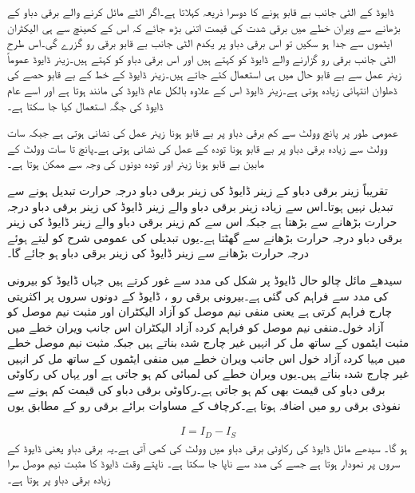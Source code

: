 ڈایوڈ کے الٹی جانب بے قابو ہونے کا دوسرا ذریعہ   کہلاتا ہے۔اگر الٹے مائل کرنے والے برقی دباو کے بڑھانے سے ویران خطے میں برقی شدت کی قیمت اتنی بڑھ جائے کہ اس کے کھینچ سے ہی الیکٹران ایٹموں سے جدا ہو سکیں تو اس برقی دباو پر یکدم الٹی جانب بے قابو برقی رو گزرے گی۔اس طرح الٹی جانب برقی رو گزارنے والے ڈایوڈ کو   کہتے ہیں اور اس برقی دباو   کو   کہتے ہیں۔زینر  ڈایوڈ عموماً زینر عمل سے بے قابو حال میں ہی استعمال کئے جاتے ہیں۔زینر  ڈایوڈ کے خط کے بے قابو حصے کی ڈھلوان  انتہائی زیادہ ہوتی ہے۔زینر  ڈایوڈ اس کے علاوہ بالکل عام  ڈایوڈ کی مانند ہوتا ہے اور اسے عام  ڈایوڈ کی جگہ استعمال کیا جا سکتا ہے۔

عمومی طور پر پانچ وولٹ سے کم برقی دباو پر بے قابو ہونا زینر عمل کی نشانی ہوتی ہے جبکہ سات وولٹ سے زیادہ برقی دباو پر بے قابو ہونا تودہ کے عمل کی نشانی ہوتی ہے۔پانچ تا سات وولٹ کے مابین بے قابو ہونا زینر اور تودہ دونوں کی وجہ سے ممکن ہوتا ہے۔

تقریباً  زینر برقی دباو کے زینر ڈایوڈ کی زینر  برقی دباو درجہ حرارت تبدیل ہونے سے تبدیل نہیں ہوتا۔اس سے زیادہ زینر برقی دباو والے زینر ڈایوڈ کی زینر برقی دباو درجہ حرارت بڑھانے سے بڑھتا ہے جبکہ اس سے کم  زینر برقی دباو والے زینر ڈایوڈ کی زینر برقی دباو درجہ حرارت بڑھانے سے گھٹتا ہے۔یوں  تبدیلی کی عمومی شرح کو  لیتے ہوئے درجہ حرارت  بڑھانے سے  زینر ڈایوڈ کی زینر برقی دباو  ہو جائے گا۔  

	سیدھے مائل چالو حال ڈایوڈ پر شکل   کی مدد سے غور کرتے ہیں جہاں ڈایوڈ کو بیرونی   کی مدد سے  فراہم کی گئی ہے۔بیرونی برقی رو ، ڈایوڈ کے دونوں سروں پر اکثریتی چارج فراہم کرتی ہے یعنی منفی نیم موصل کو آزاد الیکٹران اور مثبت نیم موصل کو آزاد خول۔منفی نیم موصل کو فراہم کردہ آزاد الیکٹران اس جانب ویران خطے میں مثبت ایٹموں کے ساتھ مل کر انہیں غیر چارج شدہ بناتے ہیں جبکہ مثبت نیم موصل خطے میں مہیا کردہ آزاد خول اس جانب ویران خطے میں منفی ایٹموں کے ساتھ مل کر انہیں غیر چارج شدہ بناتے ہیں۔یوں ویران خطے کی لمبائی کم ہو جاتی ہے اور یہاں کی رکاوٹی برقی دباو کی قیمت بھی کم ہو جاتی ہے۔رکاوٹی برقی دباو کی قیمت کم ہونے سے نفوذی برقی رو  میں اضافہ ہوتا ہے۔کرچاف کے مساوات برائے برقی رو کے مطابق یوں

\begin{align} \label{مساوات_ڈایوڈ_رو_برابر_نفوذ_منفی_لبریزی_رو}
I=I_D-I_S
\end{align}
ہو گا۔
	سیدھے مائل ڈایوڈ کی رکاوٹی برقی دباو میں  وولٹ کی کمی آتی ہے۔یہ برقی دباو یعنی  ڈایوڈ کے سروں پر نمودار ہوتا ہے جسے  کی مدد سے ناپا جا سکتا ہے۔ ناپتے وقت ڈایوڈ کا مثبت نیم موصل سرا زیادہ برقی دباو پر ہوتا ہے۔

